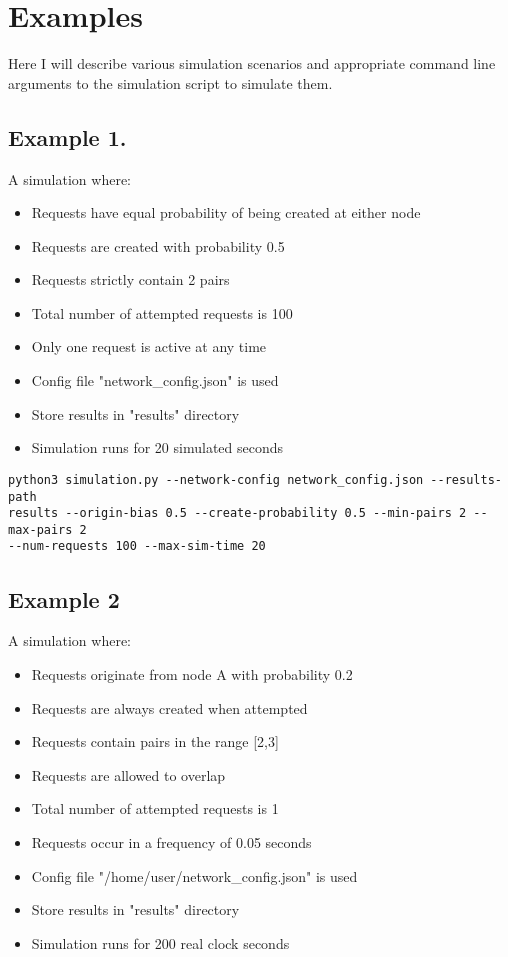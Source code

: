 \documentclass{article}
\begin{document}
\section{Examples}
Here I will describe various simulation scenarios and appropriate command line arguments to the simulation script to simulate them.
\subsection{Example 1.}
A simulation where:
\begin{itemize}
    \item Requests have equal probability of being created at either node
    \item Requests are created with probability 0.5
    \item Requests strictly contain 2 pairs
    \item Total number of attempted requests is 100
    \item Only one request is active at any time
    \item Config file "network\_config.json" is used
    \item Store results in "results" directory
    \item Simulation runs for 20 simulated seconds
\end{itemize}

\begin{verbatim}
python3 simulation.py --network-config network_config.json --results-path
results --origin-bias 0.5 --create-probability 0.5 --min-pairs 2 --max-pairs 2
--num-requests 100 --max-sim-time 20
\end{verbatim}

\subsection{Example 2}
A simulation where:
\begin{itemize}
    \item Requests originate from node A with probability 0.2
    \item Requests are always created when attempted
    \item Requests contain pairs in the range [2,3]
    \item Requests are allowed to overlap
    \item Total number of attempted requests is 1
    \item Requests occur in a frequency of 0.05 seconds
    \item Config file "/home/user/network\_config.json" is used
    \item Store results in "results" directory
    \item Simulation runs for 200 real clock seconds
\end{itemize}
\end{document}
